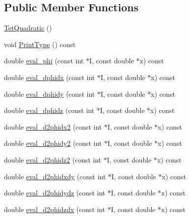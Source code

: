 \subsection*{Public Member Functions}
\begin{DoxyCompactItemize}
\item 
\mbox{\hyperlink{classfemus_1_1_tet_quadratic_abe5d9b7fa35ec126228aac3d6d938cc8}{Tet\+Quadratic}} ()
\item 
void \mbox{\hyperlink{classfemus_1_1_tet_quadratic_a64b7e71b4a3e9afb5e129313153dfbe4}{Print\+Type}} () const
\item 
double \mbox{\hyperlink{classfemus_1_1_tet_quadratic_a7eb28afedc6c1d5dde273832b37c6936}{eval\+\_\+phi}} (const int $\ast$I, const double $\ast$x) const
\item 
double \mbox{\hyperlink{classfemus_1_1_tet_quadratic_a509e172f88aabecc48e0c6d25b22889d}{eval\+\_\+dphidx}} (const int $\ast$I, const double $\ast$x) const
\item 
double \mbox{\hyperlink{classfemus_1_1_tet_quadratic_a68b5b101bab88132574d0d96f29daeb2}{eval\+\_\+dphidy}} (const int $\ast$I, const double $\ast$x) const
\item 
double \mbox{\hyperlink{classfemus_1_1_tet_quadratic_a82790f3f2440511a79ae29447a112fb8}{eval\+\_\+dphidz}} (const int $\ast$I, const double $\ast$x) const
\item 
double \mbox{\hyperlink{classfemus_1_1_tet_quadratic_a41a83721de075980d8138bb457ddc937}{eval\+\_\+d2phidx2}} (const int $\ast$I, const double $\ast$x) const
\item 
double \mbox{\hyperlink{classfemus_1_1_tet_quadratic_ab6dcc72f0cf2bdfa021645dbc164e07b}{eval\+\_\+d2phidy2}} (const int $\ast$I, const double $\ast$x) const
\item 
double \mbox{\hyperlink{classfemus_1_1_tet_quadratic_aeb639b58481285526a502c38bec1fcbf}{eval\+\_\+d2phidz2}} (const int $\ast$I, const double $\ast$x) const
\item 
double \mbox{\hyperlink{classfemus_1_1_tet_quadratic_a2fcd1051ba5599c11a1d1c570c13d9f1}{eval\+\_\+d2phidxdy}} (const int $\ast$I, const double $\ast$x) const
\item 
double \mbox{\hyperlink{classfemus_1_1_tet_quadratic_a28d5ce1ce6ee178377194fa24fa9ca10}{eval\+\_\+d2phidydz}} (const int $\ast$I, const double $\ast$x) const
\item 
double \mbox{\hyperlink{classfemus_1_1_tet_quadratic_a5b0f085e16cb9e4aa9dec091d7abeed9}{eval\+\_\+d2phidzdx}} (const int $\ast$I, const double $\ast$x) const
\end{DoxyCompactItemize}
